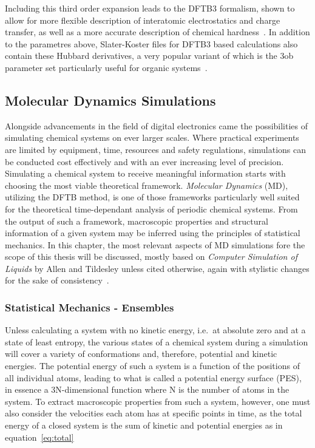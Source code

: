 \documentclass[12pt]{article}
\begin{document}
\bigskip 

\noindent Including this third order expansion leads to the DFTB3 formalism, shown to allow for more flexible description of interatomic electrostatics and charge transfer, as well as a more accurate description of chemical hardness~\cite{yangsource}. In addition to the parametres above, Slater-Koster files for DFTB3 based calculations also contain these Hubbard derivatives, a very popular variant of which is the 3ob parameter set particularly useful for organic systems~\cite{Gaus2012}.

\subsection{Molecular Dynamics Simulations}
Alongside advancements in the field of digital electronics came the possibilities of simulating chemical 
systems on ever larger scales. Where practical experiments are limited by equipment, time, resources and safety regulations, 
simulations can be conducted cost effectively and with an ever increasing level of precision.
Simulating a chemical system to receive meaningful information starts with choosing the most viable
theoretical framework. \textit{Molecular Dynamics} (MD), utilizing the DFTB method, is one of those frameworks particularly well suited for  the theoretical time-dependant analysis of periodic chemical systems. From the output of such a framework, macroscopic properties and structural information of a given system may be inferred using the principles of statistical mechanics.
In this chapter, the most relevant aspects of MD simulations fore the scope of this thesis will be discussed, mostly based on \textit{Computer Simulation of Liquids} by Allen and Tildesley unless cited otherwise, again with stylistic changes for the sake of consistency~\cite{Allen2017}.

\subsubsection{Statistical Mechanics - Ensembles}
Unless calculating a system with no kinetic energy, i.e.~at absolute zero and at a state of least entropy, the various states of a chemical system during a simulation will cover a variety of conformations and, therefore, potential and kinetic energies. The potential energy of such a system is a function of the positions of all individual atoms, leading to what is called a potential energy surface (PES), in essence a 3N-dimensional function where N is the number of atoms in the system. To extract macroscopic properties from such a system, however, one must also consider the velocities each atom has at specific points in time, as the total energy of a closed system is the sum of kinetic and potential energies as in equation~\ref{eq:total}
\end{document}
